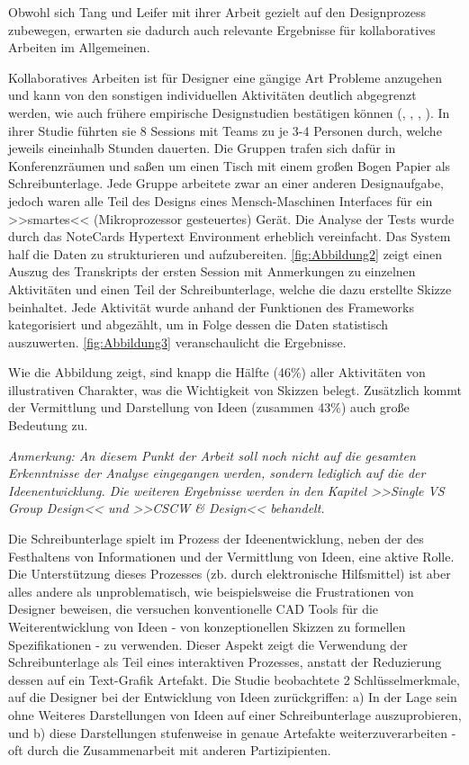 \medskip Obwohl sich Tang und Leifer mit ihrer Arbeit gezielt auf den Designprozess zubewegen, erwarten sie dadurch auch relevante Ergebnisse für kollaboratives Arbeiten im Allgemeinen. \par Kollaboratives Arbeiten ist für Designer eine gängige Art Probleme anzugehen und kann von den sonstigen individuellen Aktivitäten deutlich abgegrenzt werden, wie auch frühere empirische Designstudien bestätigen können (\cite{Ullman:1987}, \cite{Ballay:1987}, \cite{Akin:1978}, \cite{Lera:1983}).
In ihrer Studie führten sie 8 Sessions mit Teams zu je 3-4 Personen durch, welche jeweils eineinhalb Stunden dauerten. Die Gruppen trafen sich dafür in Konferenzräumen und saßen um einen Tisch mit einem großen Bogen Papier als Schreibunterlage. Jede Gruppe arbeitete zwar an einer anderen Designaufgabe, jedoch waren alle Teil des Designs eines Mensch-Maschinen Interfaces für ein >>smartes<< (Mikroprozessor gesteuertes) Gerät.
Die Analyse der Tests wurde durch das NoteCards Hypertext Environment \cite{Halasz:1986:NN:29933.30859} erheblich vereinfacht. Das System half die Daten zu strukturieren und aufzubereiten. \autoref{fig:Abbildung2} zeigt einen Auszug des Transkripts der ersten Session mit Anmerkungen zu einzelnen Aktivitäten und einen Teil der Schreibunterlage, welche die dazu erstellte Skizze beinhaltet. Jede Aktivität wurde anhand der Funktionen des Frameworks kategorisiert und abgezählt, um in Folge dessen die Daten statistisch auszuwerten. \autoref{fig:Abbildung3} veranschaulicht die Ergebnisse.

\medskip Wie die Abbildung zeigt, sind knapp die Hälfte (46\%) aller Aktivitäten von illustrativen Charakter, was die Wichtigkeit von Skizzen belegt. Zusätzlich kommt der Vermittlung und Darstellung von Ideen (zusammen 43\%) auch große Bedeutung zu.\par
\medskip \emph{Anmerkung: An diesem Punkt der Arbeit soll noch nicht auf die gesamten Erkenntnisse der Analyse eingegangen werden, sondern lediglich auf die der Ideenentwicklung. Die weiteren Ergebnisse werden in den Kapitel >>Single VS Group Design<< und >>CSCW \& Design<< behandelt.}

\medskip Die Schreibunterlage spielt im Prozess der Ideenentwicklung, neben der des Festhaltens von Informationen und der Vermittlung von Ideen, eine aktive Rolle. Die Unterstützung dieses Prozesses (zb. durch elektronische Hilfsmittel) ist aber alles andere als unproblematisch, wie beispielsweise die Frustrationen von Designer beweisen, die versuchen konventionelle CAD Tools für die Weiterentwicklung von Ideen - von konzeptionellen Skizzen zu formellen Spezifikationen - zu verwenden. Dieser Aspekt zeigt die Verwendung der Schreibunterlage als Teil eines interaktiven Prozesses, anstatt der Reduzierung dessen auf ein Text-Grafik Artefakt. 
Die Studie beobachtete 2 Schlüsselmerkmale, auf die Designer bei der Entwicklung von Ideen zurückgriffen: a) In der Lage sein ohne Weiteres Darstellungen von Ideen auf einer Schreibunterlage auszuprobieren, und b) diese Darstellungen stufenweise in genaue Artefakte weiterzuverarbeiten - oft durch die Zusammenarbeit mit anderen Partizipienten. \cite{Tang:1988p279}

